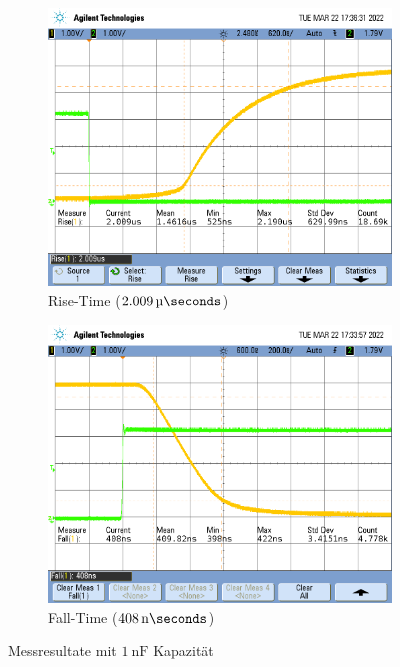 \documentclass[../main.tex]{subfiles}
\begin{document}
\begin{figure}[h]
    \centering
    \begin{subfigure}[b]{0.45\textwidth}
        \centering
        \includegraphics[width=\textwidth]{assets/task3_square/SquareRise_1nF.png}
        \caption{Rise-Time ($\SI{2.009}{\micro\seconds}$)}
        \label{fig:square_rise}
    \end{subfigure}
    \hfill
    \begin{subfigure}[b]{0.45\textwidth}
        \centering
        \includegraphics[width=\textwidth]{assets/task3_square/SquareFall_1nF.png}
        \caption{Fall-Time ($\SI{408}{\nano\seconds}$)}
        \label{fig:square_fall}
    \end{subfigure}
    \caption{Messresultate mit $\SI{1}{\nano\farad}$ Kapazität}
    \label{fig:square_no_cap}
\end{figure}
\end{document}
